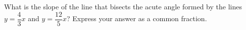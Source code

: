 What is the slope of the line that bisects the acute angle formed by the lines $y=\dfrac{4}{3}x$ and $y=\dfrac{12}{5}x$? Express your answer as a common fraction.

